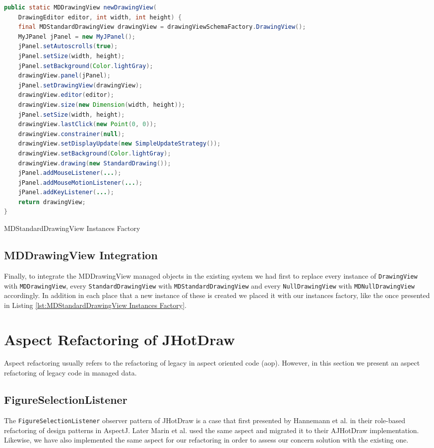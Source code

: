 \begin{sourcecode}[H]
	\begin{lstlisting}[language=Java, escapechar=|]
public static MDDrawingView newDrawingView(
	DrawingEditor editor, int width, int height) {
	final MDStandardDrawingView drawingView = drawingViewSchemaFactory.DrawingView();
	MyJPanel jPanel = new MyJPanel();
	jPanel.setAutoscrolls(true);
 	jPanel.setSize(width, height);
	jPanel.setBackground(Color.lightGray);
	drawingView.panel(jPanel);
	jPanel.setDrawingView(drawingView);
	drawingView.editor(editor);
	drawingView.size(new Dimension(width, height));
	jPanel.setSize(width, height);
	drawingView.lastClick(new Point(0, 0));
	drawingView.constrainer(null);
	drawingView.setDisplayUpdate(new SimpleUpdateStrategy());
	drawingView.setBackground(Color.lightGray);
	drawingView.drawing(new StandardDrawing());
	jPanel.addMouseListener(...);
	jPanel.addMouseMotionListener(...);
	jPanel.addKeyListener(...);
	return drawingView;
}
	\end{lstlisting}
	\label{lst:MDStandardDrawingView Instances Factory}
	\caption{MDStandardDrawingView Instances Factory}
\end{sourcecode}

\subsection{MDDrawingView Integration}
Finally, to integrate the MDDrawingView managed objects in the existing system we had first to replace every instance of \texttt{DrawingView} with \texttt{MDDrawingView}, every \texttt{StandardDrawingView} with \texttt{MDStandardDrawingView} and every \texttt{NullDrawingView} with \texttt{MDNullDrawingView} accordingly.
In addition in each place that a new instance of these is created we placed it with our instances factory, like the once presented in Listing \ref{lst:MDStandardDrawingView Instances Factory}.

\section{Aspect Refactoring of JHotDraw}
Aspect refactoring usually refers to the refactoring of legacy in aspect oriented code (\ac{aop}). 
However, in this section we present an aspect refactoring of legacy code in managed data.

\subsection{FigureSelectionListener}
The \texttt{FigureSelectionListener} observer pattern of JHotDraw is a case that first presented by Hannemann et al. \cite{hannemann2005role} in their role-based refactoring of design patterns in AspectJ. 
Later Marin et al. used the same aspect and migrated it to their AJHotDraw implementation.
Likewise, we have also implemented the same aspect for our refactoring in order to assess our concern solution with the existing one.

